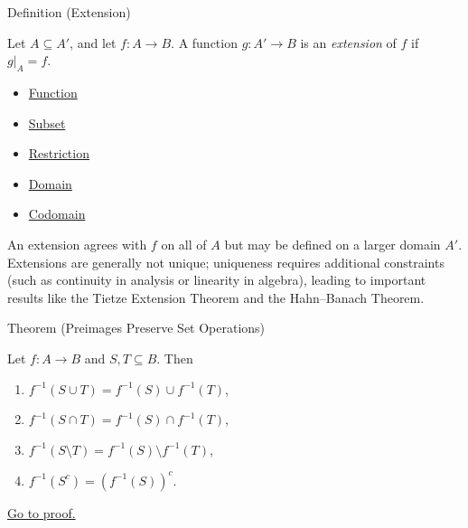 \begin{definitionbox}{Definition (Extension)}
\begin{definition}[Extension]\label{def:fn-extension}
Let $A \subseteq A'$, and let $f : A \to B$. A function $g : A' \to B$ is an
\emph{extension} of $f$ if $g|_A = f$.
\end{definition}
\end{definitionbox}

\begin{dependencies}
\begin{itemize}
  \item \hyperref[def:function]{Function}
  \item \hyperref[def:subset]{Subset}
  \item \hyperref[def:restriction]{Restriction}
  \item \hyperref[def:domain]{Domain}
  \item \hyperref[def:codomain]{Codomain}
\end{itemize}
\end{dependencies}

\begin{remark*}
An extension agrees with $f$ on all of $A$ but may be defined on a larger
domain $A'$. Extensions are generally not unique; uniqueness requires additional
constraints (such as continuity in analysis or linearity in algebra), leading to
important results like the Tietze Extension Theorem and the Hahn--Banach
Theorem.
\end{remark*}

\begin{theorembox}{Theorem (Preimages Preserve Set Operations)}
\begin{theorem}\label{thm:preimage-ops}
Let $f : A \to B$ and $S, T \subseteq B$. Then
\begin{enumerate}[label=(\roman*)]
\item $f^{-1}(S \cup T) = f^{-1}(S) \cup f^{-1}(T)$,
\item $f^{-1}(S \cap T) = f^{-1}(S) \cap f^{-1}(T)$,
\item $f^{-1}(S \setminus T) = f^{-1}(S) \setminus f^{-1}(T)$,
\item $f^{-1}(S^c) = (f^{-1}(S))^c$.
\end{enumerate}
\hyperref[prf:preimage-ops]{Go to proof.}
\end{theorem}
\end{theorembox}

